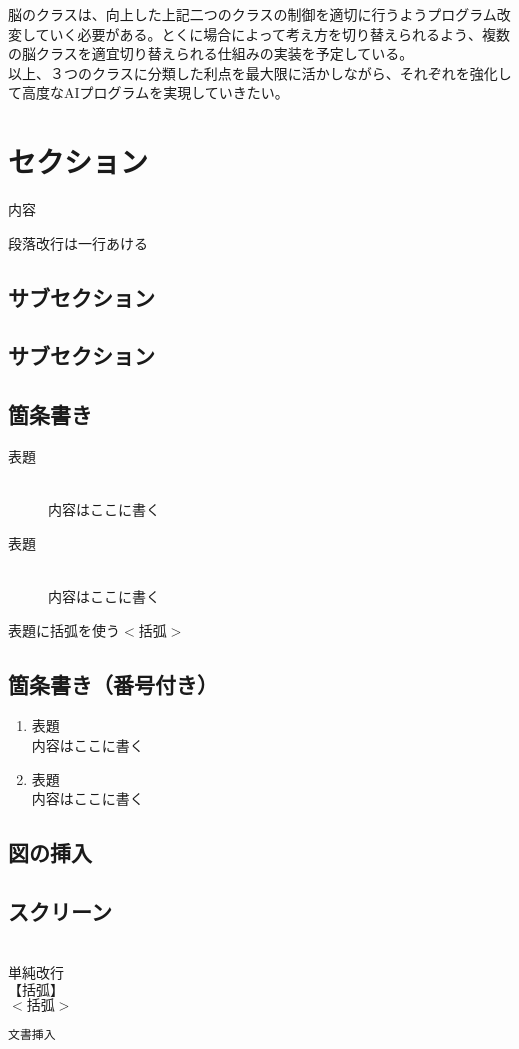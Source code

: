 \documentclass[a4j]{jarticle}
\begin{document}
脳のクラスは、向上した上記二つのクラスの制御を適切に行うようプログラム改変していく必要がある。とくに場合によって考え方を切り替えられるよう、複数の脳クラスを適宜切り替えられる仕組みの実装を予定している。
\\

以上、３つのクラスに分類した利点を最大限に活かしながら、それぞれを強化して高度なAIプログラムを実現していきたい。

\section{セクション}
内容

段落改行は一行あける
\subsection{サブセクション}
\subsection{サブセクション}

\subsection{箇条書き}
\begin{description}
\item [表題]~\\
内容はここに書く
\item[表題]\mbox{}\\
内容はここに書く
\item[表題に括弧を使う$<$括弧$>$]
\end{description}

\subsection{箇条書き（番号付き）}
\begin{enumerate}
\item 表題　~\\
内容はここに書く 
\item 表題　\mbox{}\\
内容はここに書く 
\end{enumerate}

\subsection{図の挿入}

\subsection{スクリーン}
\begin{screen}
~\\
単純改行\\
$【括弧】$\\
$<括弧>$ \\
\end{screen}
\begin{verbatim}
文書挿入
\end{verbatim}
\end{document}
